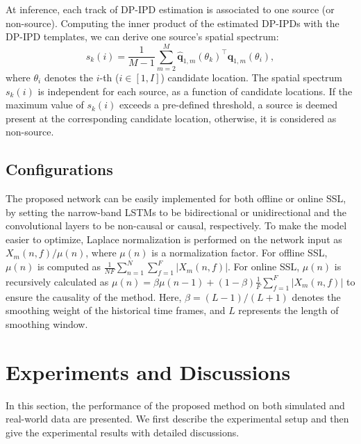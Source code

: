 \documentclass[lettersize,journal]{IEEEtran}
\begin{document}
At inference, each track of DP-IPD estimation is associated to one source  (or non-source). Computing the inner product of the estimated DP-IPDs  with the DP-IPD templates, we can derive one source's spatial spectrum: 
\begin{equation}
s_k(i)=\frac{1}{M-1}\sum_{m=2}^M \hat{\mathbf{q}}_{1,m}(\theta_{{k}})^{\top} {\mathbf{q}}_{1,m}(\theta_{i}),
\end{equation}
where $\theta_{i}$ denotes the $i$-th ($i\in[1,I]$) candidate location. The spatial spectrum $s_k(i)$ is independent for each source, as a function of candidate locations.  
If the maximum value of $s_k(i)$ exceeds a pre-defined threshold, a source is deemed present at the corresponding candidate location, otherwise, it is considered as non-source.

\subsection{Configurations}
The proposed network can be easily implemented for both offline or online SSL,  
by setting the narrow-band LSTMs to be bidirectional or unidirectional and the convolutional layers to be non-causal or causal, respectively. 
To make the model easier to optimize, Laplace normalization is performed on the network input as $X_m(n, f) / \mu(n)$, where $\mu(n)$ is a normalization factor. For offline SSL, $\mu(n)$ is computed as $\frac{1}{NF} \sum_{n=1}^N \sum_{f=1}^{F}\left|X_m(n, f)\right|$. For online SSL, $\mu(n)$ is recursively calculated as $\mu(n)=\beta \mu(n-1)+(1-\beta) \frac{1}{F} \sum_{f=1}^{F}\left|X_m(n, f)\right|$ \cite{Yang2022McNetFM} to ensure the causality of the method. Here, $\beta={(L-1)}/{(L+1)}$ denotes the smoothing weight of the historical time frames, and $L$ represents the length of smoothing window.

\section{Experiments and Discussions}\label{sec:exp}
In this section, the performance of the proposed method on both simulated and real-world data are presented. We first describe the experimental setup and then give the experimental results with detailed discussions.
\end{document}
